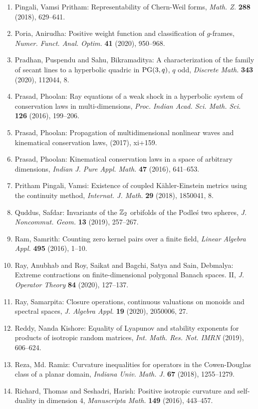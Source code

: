 \begin{enumerate}
\item Pingali, Vamsi Pritham: Representability of {C}hern-{W}eil forms, \emph{Math. Z.} {\bf 288} (2018), 629--641.
\item Poria, Anirudha: Positive weight function and classification of {$g$}-frames, \emph{Numer. Funct. Anal. Optim.} {\bf 41} (2020), 950--968.
\item Pradhan, Puspendu and Sahu, Bikramaditya: A characterization of the family of secant lines to a
hyperbolic quadric in {${\rm PG} (3,q)$}, {$q$} odd, \emph{Discrete Math.} {\bf 343} (2020), 112044, 8.
\item Prasad, Phoolan: Ray equations of a weak shock in a hyperbolic system of
conservation laws in multi-dimensions, \emph{Proc. Indian Acad. Sci. Math. Sci.} {\bf 126} (2016), 199--206.
\item Prasad, Phoolan: Propagation of multidimensional nonlinear waves and
kinematical conservation laws, \emph{} {\bf } (2017), xi+159.
\item Prasad, Phoolan: Kinematical conservation laws in a space of arbitrary
dimensions, \emph{Indian J. Pure Appl. Math.} {\bf 47} (2016), 641--653.
\item Pritham Pingali, Vamsi: Existence of coupled {K}\"{a}hler-{E}instein metrics using the
continuity method, \emph{Internat. J. Math.} {\bf 29} (2018), 1850041, 8.
\item Quddus, Safdar: Invariants of the {$\Bbb Z_2$} orbifolds of the {P}odle\'{s} two
spheres, \emph{J. Noncommut. Geom.} {\bf 13} (2019), 257--267.
\item Ram, Samrith: Counting zero kernel pairs over a finite field, \emph{Linear Algebra Appl.} {\bf 495} (2016), 1--10.
\item Ray, Anubhab and Roy, Saikat and Bagchi, Satya and Sain,
Debmalya: Extreme contractions on finite-dimensional polygonal {B}anach
spaces. {II}, \emph{J. Operator Theory} {\bf 84} (2020), 127--137.
\item Ray, Samarpita: Closure operations, continuous valuations on monoids and
spectral spaces, \emph{J. Algebra Appl.} {\bf 19} (2020), 2050006, 27.
\item Reddy, Nanda Kishore: Equality of {L}yapunov and stability exponents for products of
isotropic random matrices, \emph{Int. Math. Res. Not. IMRN} {\bf } (2019), 606--624.
\item Reza, Md. Ramiz: Curvature inequalities for operators in the {C}owen-{D}ouglas
class of a planar domain, \emph{Indiana Univ. Math. J.} {\bf 67} (2018), 1255--1279.
\item Richard, Thomas and Seshadri, Harish: Positive isotropic curvature and self-duality in dimension 4, \emph{Manuscripta Math.} {\bf 149} (2016), 443--457.

\end{enumerate}
